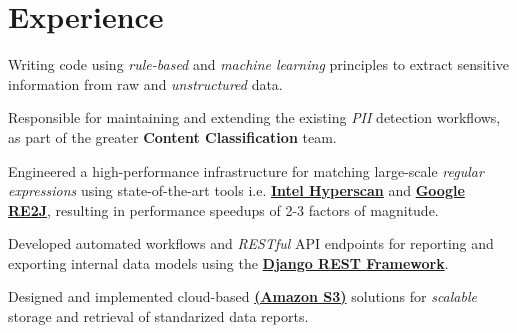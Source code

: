 \documentclass[]{openfont}
\begin{document}
\hfill
\begin{minipage}[t]{0.65\textwidth}


    \section{Experience}
    \vspace{\topsep}
    \begin{tightemize}
        \item Writing code using \textit{rule-based} and \textit{machine learning} principles to extract sensitive information from raw and \textit{unstructured} data.
        \item Responsible for maintaining and extending the existing \textit{PII} detection workflows, as part of the greater \textbf{Content Classification} team.
    \end{tightemize}
    \sectionsep

    \begin{tightemize}
        \item Engineered a high-performance infrastructure for matching large-scale \textit{regular expressions} using state-of-the-art tools i.e. \href{https://www.intel.com/content/www/us/en/developer/articles/technical/introduction-to-hyperscan.html}{\textbf{Intel Hyperscan}} and \href{https://github.com/google/re2j}{\textbf{Google RE2J}}, resulting in performance speedups of 2-3 factors of magnitude.
    \end{tightemize}
    \sectionsep

    \begin{tightemize}
        \item Developed automated workflows and \textit{RESTful} API endpoints for reporting and exporting internal data models using the \textbf{\href{https://www.django-rest-framework.org/}{Django REST Framework}}.
        \item Designed and implemented cloud-based \href{https://aws.amazon.com/s3/}{\textbf{(Amazon S3)}} solutions for \textit{scalable} storage and retrieval of standarized data reports.
    \end{tightemize}
    \sectionsep


\end{minipage}
\end{document}
